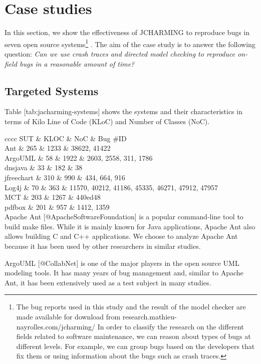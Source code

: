 \section{Case studies}\label{case-studies}

In this section, we show the effectiveness of JCHARMING to reproduce
bugs in seven open source systems\footnote{The bug reports used in this
  study and the result of the model checker are made available for
  download from research.mathieu- nayrolles.com/jcharming/ In order to
  classify the research on the different fields related to software
  maintenance, we can reason about types of bugs at different levels.
  For example, we can group bugs based on the developers that fix them
  or using information about the bugs such as crash traces.} . The aim
of the case study is to answer the following question: {\emph{Can we use
crash traces and directed model checking to reproduce on- field bugs in
a reasonable amount of time?}}

\subsection{Targeted Systems}\label{targeted-systems}

Table {[}tab:jacharming-systems{]} shows the systems and their
characteristics in terms of Kilo Line of Code (KLoC) and Number of
Classes (NoC).

{c\textbar{}c\textbar{}c\textbar{}c} SUT \& KLOC \& NoC \& Bug \#ID\\
Ant \& 265 \& 1233 \& 38622, 41422\\
ArgoUML \& 58 \& 1922 \& 2603, 2558, 311, 1786\\
dnsjava \& 33 \& 182 \& 38\\
jfreechart \& 310 \& 990 \& 434, 664, 916\\
Log4j \& 70 \& 363 \& 11570, 40212, 41186, 45335, 46271, 47912, 47957\\
MCT \& 203 \& 1267 \& 440ed48\\
pdfbox \& 201 \& 957 \& 1412, 1359\\
Apache Ant {[}@ApacheSoftwareFoundation{]} is a popular command-line
tool to build make files. While it is mainly known for Java
applications, Apache Ant also allows building C and C++ applications. We
choose to analyze Apache Ant because it has been used by other
researchers in similar studies.

ArgoUML {[}@CollabNet{]} is one of the major players in the open source
UML modeling tools. It has many years of bug management and, similar to
Apache Ant, it has been extensively used as a test subject in many
studies.

